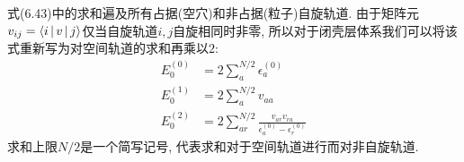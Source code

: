 式(6.43)中的求和遍及所有占据(空穴)和非占据(粒子)自旋轨道. 由于矩阵元$v_{ij} = \Braket{i|v|j}$仅当自旋轨道$i,j$自旋相同时非零, 所以对于闭壳层体系我们可以将该式重新写为对空间轨道的求和再乘以$2$:
\begin{subequations}
	\begin{align}
	E_0^{(0)} & = 2\sum_a^{N/2}\epsilon_a^{(0)}\\
	E_0^{(1)} & = 2\sum_a^{N/2}v_{aa} \\
	E_0^{(2)} & = 2\sum_{ar}^{N/2}\frac{v_{ar}v_{ra}}{\epsilon_a^{(0)} - \epsilon_r^{(0)}}
	\end{align}
\end{subequations}
求和上限$N/2$是一个简写记号, 代表求和对于空间轨道进行而对非自旋轨道.
